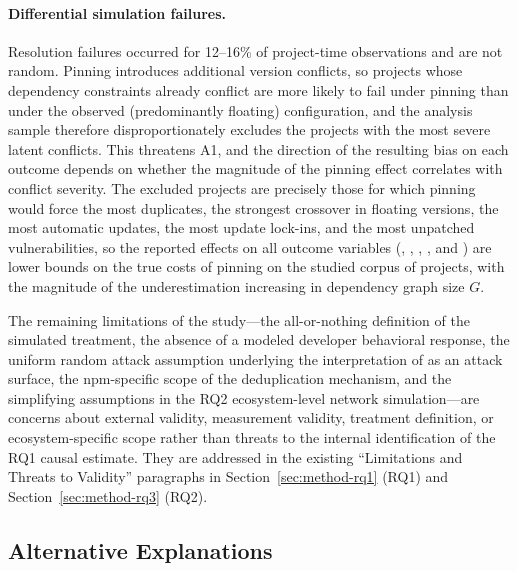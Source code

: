 \paragraph{Differential simulation failures.}
Resolution failures occurred for 12--16\% of project-time observations and are not random.
Pinning introduces additional version conflicts, so projects whose dependency constraints already conflict are more likely to fail under pinning than under the observed (predominantly floating) configuration, and the analysis sample therefore disproportionately excludes the projects with the most severe latent conflicts.
This threatens A1, and the direction of the resulting bias on each outcome depends on whether the magnitude of the pinning effect correlates with conflict severity.
The excluded projects are precisely those for which pinning would force the most duplicates, the strongest crossover in floating versions, the most automatic updates, the most update lock-ins, and the most unpatched vulnerabilities, so the reported effects on all outcome variables (, , , , and ) are lower bounds on the true costs of pinning on the studied corpus of projects, with the magnitude of the underestimation increasing in dependency graph size $G$.

The remaining limitations of the study---the all-or-nothing definition of the simulated treatment, the absence of a modeled developer behavioral response, the uniform random attack assumption underlying the interpretation of  as an attack surface, the npm-specific scope of the deduplication mechanism, and the simplifying assumptions in the RQ2 ecosystem-level network simulation---are concerns about external validity, measurement validity, treatment definition, or ecosystem-specific scope rather than threats to the internal identification of the RQ1 causal estimate.
They are addressed in the existing ``Limitations and Threats to Validity'' paragraphs in Section~\ref{sec:method-rq1} (RQ1) and Section~\ref{sec:method-rq3} (RQ2).

\subsection{Alternative Explanations}
\label{sec:pinning-credibility-alternatives}


